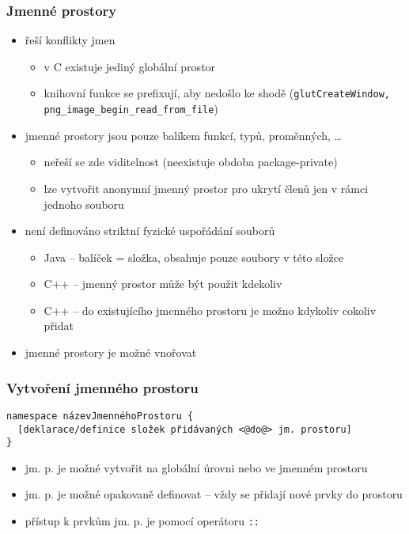 
\begin{frame}[fragile]
\frametitle{Jmenné prostory}

\begin{block}{}
\begin{itemize}
\item řeší konflikty jmen
\begin{itemize}
\item v C existuje jediný globální prostor
\item knihovní funkce se prefixují, aby nedošlo ke shodě (\lstinline|glutCreateWindow, png_image_begin_read_from_file|)
\end{itemize}

\item jmenné prostory jsou pouze balíkem funkcí, typů, proměnných, \ldots
\begin{itemize}
\item neřeší se zde viditelnost (neexistuje obdoba package-private)
\item lze vytvořit anonymní jmenný prostor pro ukrytí členů jen v rámci jednoho souboru
\end{itemize}

\item není definováno striktní fyzické uspořádání souborů
\begin{itemize}
\item Java -- balíček = složka, obsahuje pouze soubory v této složce
\item C++ -- jmenný prostor může být použit kdekoliv
\item C++ -- do existujícího jmenného prostoru je možno kdykoliv cokoliv přidat
\end{itemize}

\item jmenné prostory je možné vnořovat
\end{itemize}
\end{block}
\end{frame}



\begin{frame}[fragile]
\frametitle{Vytvoření jmenného prostoru}
\begin{noteblock}{}
\begin{lstlisting}
namespace názevJmennéhoProstoru {
  [deklarace/definice složek přidávaných <@do@> jm. prostoru] 
}
\end{lstlisting}
\end{noteblock}

\begin{block}{}
\begin{itemize}
\item jm. p. je možné vytvořit na globální úrovni nebo ve jmenném prostoru
\item jm. p. je možné opakovaně definovat -- vždy se přidají nové prvky do prostoru
\item přístup k prvkům jm. p. je pomocí operátoru \lstinline|::|
\end{itemize}
\end{block}
\end{frame}




